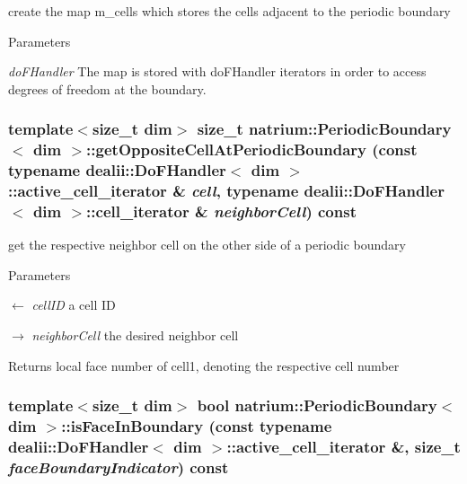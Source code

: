 create the map m\_\-cells which stores the cells adjacent to the periodic boundary 
\begin{DoxyParams}{Parameters}
\item[{\em doFHandler}]The map is stored with doFHandler iterators in order to access degrees of freedom at the boundary. \end{DoxyParams}
\hypertarget{classnatrium_1_1PeriodicBoundary_aaa861135e070feb4b3dd4408c487cd14}{
\subsubsection[{getOppositeCellAtPeriodicBoundary}]{\setlength{\rightskip}{0pt plus 5cm}template$<$size\_\-t dim$>$ size\_\-t {\bf natrium::PeriodicBoundary}$<$ dim $>$::getOppositeCellAtPeriodicBoundary (const typename dealii::DoFHandler$<$ dim $>$::active\_\-cell\_\-iterator \& {\em cell}, \/  typename dealii::DoFHandler$<$ dim $>$::cell\_\-iterator \& {\em neighborCell}) const}}
\label{classnatrium_1_1PeriodicBoundary_aaa861135e070feb4b3dd4408c487cd14}


get the respective neighbor cell on the other side of a periodic boundary 
\begin{DoxyParams}{Parameters}
\item[\mbox{$\leftarrow$} {\em cellID}]a cell ID \item[\mbox{$\rightarrow$} {\em neighborCell}]the desired neighbor cell\end{DoxyParams}
\begin{DoxyReturn}{Returns}
local face number of cell1, denoting the respective cell number 
\end{DoxyReturn}
\hypertarget{classnatrium_1_1PeriodicBoundary_af43c1306653cc8a9d5aea68edcfca370}{
\subsubsection[{isFaceInBoundary}]{\setlength{\rightskip}{0pt plus 5cm}template$<$size\_\-t dim$>$ bool {\bf natrium::PeriodicBoundary}$<$ dim $>$::isFaceInBoundary (const typename dealii::DoFHandler$<$ dim $>$::active\_\-cell\_\-iterator \&, \/  size\_\-t {\em faceBoundaryIndicator}) const}}
\label{classnatrium_1_1PeriodicBoundary_af43c1306653cc8a9d5aea68edcfca370}


